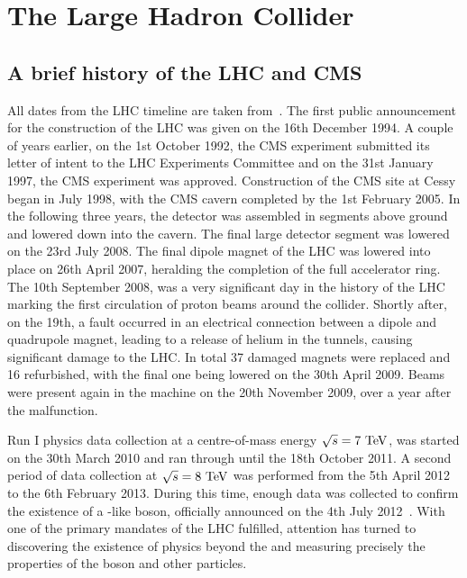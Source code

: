 \section{The Large Hadron Collider}
\label{sec:LHC}

\subsection{A brief history of the LHC and CMS}
\label{ssec:LHCHist}
All dates from the LHC timeline are taken from~\cite{LHCtimeline}.
The first public announcement for the construction of the LHC was given on the 16th December 1994. 
A couple of years earlier, on the 1st October 1992, the CMS experiment submitted its letter of intent to the LHC Experiments Committee and on the 31st January 1997, the CMS experiment was approved.
Construction of the CMS site at Cessy began in July 1998, with the CMS cavern completed by the 1st February 2005.
In the following three years, the detector was assembled in segments above ground and lowered down into the cavern.
The final large detector segment was lowered on the 23rd July 2008.
The final dipole magnet of the LHC was lowered into place on 26th April 2007, heralding the completion of the full accelerator ring.
The 10th September 2008, was a very significant day in the history of the LHC marking the first circulation of proton beams around the collider. 
Shortly after, on the 19th, a fault occurred in an electrical connection between a dipole and quadrupole magnet, leading to a release of helium in the tunnels, causing significant damage to the LHC. 
In total 37 damaged magnets were replaced and 16 refurbished, with the final one being lowered on the 30th April 2009. 
Beams were present again in the machine on the 20th November 2009, over a year after the malfunction. 

Run I physics data collection at a centre-of-mass energy $\sqrt{s}=7\mathrm{~Te\hspace{-.08em}V}^{}$, was started on the 30th March 2010 and ran through until the 18th October 2011. 
A second period of data collection at $\sqrt{s}=8\mathrm{~Te\hspace{-.08em}V}^{}$ was performed from the 5th April 2012 to the 6th February 2013. 
During this time, enough data was collected to confirm the existence of a \SM{}-like \Hboson{} boson, officially announced on the 4th July 2012~\cite{CMS:Higgs}.
With one of the primary mandates of the LHC fulfilled, attention has turned to discovering the existence of physics beyond the \SM{} and measuring precisely the properties of the \Hboson{} boson and other \SM{} particles.

